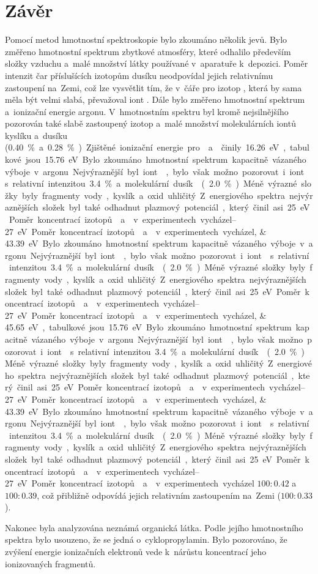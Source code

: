 \documentclass{protokol}
\begin{document}
\section{Závěr}
Pomocí metod hmotnostní spektroskopie bylo zkoumáno několik jevů.
Bylo změřeno hmotnostní spektrum zbytkové atmosféry, které odhalilo
především složky vzduchu a~malé množství látky používané v~aparatuře
k~depozici.
Poměr intenzit čar příslušících izotopům dusíku neodpovídal jejich
relativnímu zastoupení na~Zemi, což lze vysvětlit tím, že v~čáře
pro izotop , která by sama měla být velmi slabá,
převažoval iont .
Dále bylo změřeno hmotnostní spektrum a~ionizační energie argonu.
V~hmotnostním spektru byl kromě nejsilnějšího 
pozorován také slabě zastoupený izotop 
a~malé množství molekulárních iontů kyslíku a~dusíku
(\SI{0.40}\percent a~\SI{0.28}\percent).
Zjištěné ionizační energie pro  a~ činily
\SIlist{16.26;45.65}\electronvolt,
tabulkové jsou \SIlist{15.76;43.39}\electronvolt.

Bylo zkoumáno hmotnostní spektrum kapacitně vázaného výboje v~argonu.
Nejvýraznější byl iont , bylo však možno pozorovat
i~iont  s~relativní intenzitou \SI{3.4}\percent
a~molekulární dusík  (\SI{2.0}\percent).
Méně výrazné složky byly fragmenty vody, kyslík a~oxid uhličitý.
Z~energiového spektra nejvýraznějších složek byl také odhadnut
plazmový potenciál, který činil asi \SIrange{25}{27}\electronvolt.
Poměr koncentrací izotopů  a~ v~experimentech
vycházel $100:\num{0.42}$ a~$100:\num{0.39}$, což přibližně odpovídá jejich
relativním zastoupením na~Zemi ($\num{100}:\num{0.33}$).

Nakonec byla analyzována neznámá organická látka.
Podle jejího hmotnostního spektra bylo usouzeno, že se jedná
o~cyklopropylamin.
Bylo pozorováno, že zvýšení energie ionizačních elektronů vede
k~nárůstu koncentrací jeho ionizovaných fragmentů.

\printbibliography[title={Seznam použité literatury}]
\end{document}
